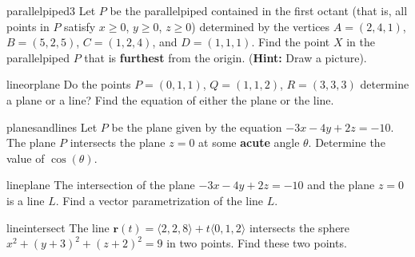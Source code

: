 \begin{problem}{parallelpiped3}
    Let $P$ be the parallelpiped contained in the first octant (that is, all points in $P$ satisfy $x \geq 0$, $y \geq 0$, $z \geq 0$) determined by the vertices $A= (2,4,1)$, $B= (5,2,5)$, $C= (1,2,4)$, and $D = (1,1,1)$. Find the point $X$ in the parallelpiped $P$ that is \textbf{furthest} from the origin. (\textbf{Hint:} Draw a picture).
\end{problem}

\begin{problem}{lineorplane}
    Do the points $P = (0,1,1)$, $Q = (1,1,2)$, $R = (3,3,3)$ determine a plane or a line?  Find the equation of either the plane or the line.
\end{problem}

\begin{problem}{planesandlines}
    Let $P$ be the plane given by the equation $-3x - 4y+2z = -10$. The plane $P$ intersects the plane $z=0$ at some \textbf{acute} angle $\theta$.  Determine the value of $\cos(\theta)$.
\end{problem}

\begin{problem}{lineplane}
    The intersection of the plane $-3x - 4y+2z = -10$ and the plane $z=0$ is a line $L$.  Find a vector parametrization of the line $L$.
\end{problem}

\begin{problem}{lineintersect}
    The line $\bm{r}(t) = \langle 2, 2, 8 \rangle + t\langle 0,1,2\rangle$ intersects the sphere $x^2 + (y+3)^2 + (z+2)^2 = 9$ in two points.  Find these two points.
\end{problem}
